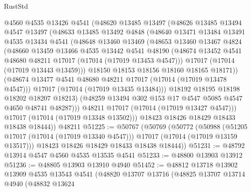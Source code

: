 \begin{lexlean}{RustStd}
\begin{coremodule}
{\begin{coremodule}
{{{{{{{{{{{{{{{{{{{{{{{{{{{{{{{{{{{{{{{{{{{{{{{{{{{{{{{            @4560
            @4535
            @13426
            @4541
            (@48620
              @13485
              @13497
              (@48626
                @13485
                @13494
                @4547
                @13497
                (@48633
                  @13485
                  @13492
                  @4848
                  (@48640
                    @13471
                    @13484
                    @13491
                    @4535
                    @13434
                    @4541
                    (@48648
                      @13460
                      @13469
                      (@48653
                        @13460
                        @13467
                        @4824
                        (@48660
                          @13459
                          @13466
                          @4535
                          @13442
                          @4541
                          @48190
                          (@48674 @13452 @4541 @48680 @48211 @17017 (@17014 (@17019 @13453 @4547)))
                          @17017
                          (@17014 (@17019 @13443 @13459)))
                        @18150
                        @18153
                        @18156
                        @18160
                        @18165
                        @18171))
                    (@48674 @13477 @4541 @48680 @48211 @17017 (@17014 (@17019 @13478 @4547)))
                    @17017
                    (@17014 (@17019 @13435 @13484)))
                  @18192
                  @18195
                  @18198
                  @18202
                  @18207
                  @18213)
                (@48259 @13494 @302 @153 @17 @4547 @5085 @4547 @4650 @48741 @48287)))
            @48211
            @17017
            (@17014 (@17019 @13427 @4547)))
          @17017
          (@17014 (@17019 @13348 @13502)))
        @18423
        @18426
        @18429
        @18433
        @18438
        @18444))
    @48211
@51225 := @50767
    (@50769
      (@50772
        (@50988
          (@51205 @17017 (@17014 (@17019 @13340 @4547)))
          @17017
          (@17014 (@17019 @13159 @13517)))
        @18423
        @18426
        @18429
        @18433
        @18438
        @18444))
@51231 := @48792 @13914 @4547 @4560 @4535 @13535 @4541
@51233 := @48800 @13903 @13912
@51236 := @48805 @13903 @13910 @4940
@51452 := @48812
    @13718
    @13902
    @13909
    @4535
    @13543
    @4541
    (@48820
      @13707
      @13716
      (@48825
        @13707
        @13714
        @4940
        (@48832
          @13624
}}}}}}}}}}}}}}}}}}}}}}}}}}}}}}}}}}}}}}}}}}}}}}}}}}}}}}}
\end{coremodule}}
\end{coremodule}
\end{lexlean}
